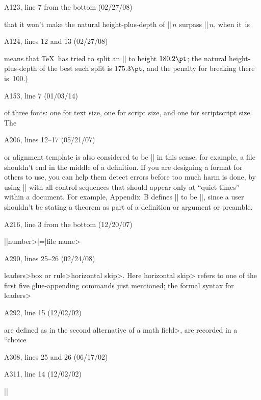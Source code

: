 \bugonpage A123, line 7 from the bottom (02/27/08)

\ninepoint\noindent
that it won't make the natural height-plus-depth
of\/ |\box|$\,n$ surpass |\dimen|$\,n$, when it~is\cutpar

\bugonpage A124, lines 12 and 13 (02/27/08)

\ninepoint\noindent
means that \TeX\ has tried to split an || to height $180.2\pt$;
the natural height-plus-depth of the best such split is $175.3\pt$,
and the penalty for breaking there is~100.)

\bugonpage A153, line 7 (01/03/14)

\ninepoint\noindent
of three fonts: one for text size, one for
script size, and one for scriptscript size. The\cutpar

\bugonpage A206, lines 12--17 (05/21/07)

\ninepoint\noindent
or alignment template
is also considered to be |\outer| in this sense; for example, a
file shouldn't end in the middle of a definition. If you are designing a
format for others to use, you can help them detect errors before too much
harm is done, by using |\outer| with all control sequences that should
appear only at ``quiet times'' within a document. For example, Appendix~B
defines |\proclaim| to be |\outer|, since a user shouldn't be stating a
theorem as part of a definition or argument or preamble.


\bugonpage A216, line 3 from the bottom (12/20/07)

\ninepoint\indent|\openin|\<number>|=|\<file name>

\bugonpage A290, lines 25--26 (02/24/08)

\ninepoint\textindent{$\bull$}
\<leaders>\<box or rule>\<horizontal skip>.\enskip
Here \<horizontal skip> refers to one of the first five glue-appending
commands just mentioned; the formal syntax for \<leaders>\cutpar

\bugonpage A292, line 15 (12/02/02)

\ninepoint\noindent
are defined as in the
second alternative of a \<math field>, are
recorded in a ``choice\cutpar

\bugonpage A308, lines 25 and 26 (06/17/02)

\ninepoint
\begintt
\def\appendroman#1#2#3{\expandafter\def\expandafter#1\expandafter
  {\csname\expandafter\gobble\string#2\romannumeral#3\endcsname}}
\endtt

\bugonpage A311, line 14 (12/02/02)

\ninepoint\indent
|\def\\{\if\space\next\ %

\bugonpage A311, line 17 (12/29/07)

\ninepoint\indent
|  \leavevmode\copy0\kern-\wd0\makelightbox}|


